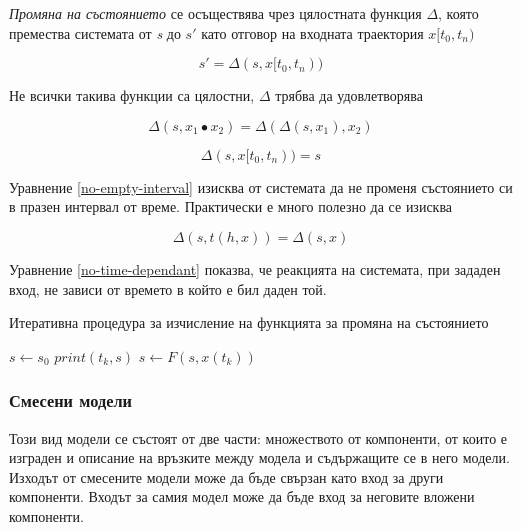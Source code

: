 			\emph{Промяна на състоянието} се осъществява чрез цялостната функция $\Delta$, която премества системата от \emph{s} до
			$s\prime$ като отговор на входната траектория $x[t_0, t_n)$
			
			\begin{equation}
				s\prime = \Delta(s, x[t_0, t_n))
			\end{equation}
			
			Не всички такива функции са цялостни, $\Delta$ трябва да удовлетворява
			
			\begin{equation}
				\Delta(s, x_1 \bullet x_2) = \Delta(\Delta(s, x_1), x_2)
			\end{equation}
			
			\begin{equation}\label{no-empty-interval}
				\Delta(s, x[t_0, t_n)) = s
			\end{equation}
			
			Уравнение \eqref{no-empty-interval} изисква от системата да не променя състоянието си
			в празен интервал от време. Практически е много полезно да се изисква
			
			\begin{equation}\label{no-time-dependant}
				\Delta(s, t(h, x)) = \Delta(s, x)
			\end{equation}
			
			Уравнение \eqref{no-time-dependant} показва, че реакцията на системата, при зададен вход, не зависи
			от времето в който е бил даден той.
			
			\begin{algorithm}				
				\caption{Итеративна процедура за изчисление на функцията за промяна на състоянието}				
				\label{algorithm:state-transition}
				\begin{algorithmic}
					\State $s\gets s_0$
						\State $print(t_k, s)$
						\State $s\gets F(s, x(t_k))$
					\EndFor
				\end{algorithmic}
			\end{algorithm}
			
		\subsubsection{Смесени модели}
		
		Този вид модели се състоят от две части: множеството от компоненти, от които е изграден и описание
		на връзките между модела и съдържащите се в него модели. Изходът от смесените модели
		може да бъде свързан като вход за други компоненти. Входът за самия модел може да бъде вход за
		неговите вложени компоненти.
		
